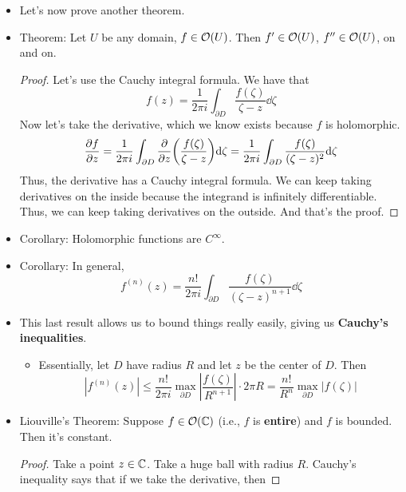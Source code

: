 \documentclass[../notes.tex]{subfiles}
\begin{document}
\begin{itemize}
    \item Let's now prove another theorem.
    \item Theorem: Let $U$ be any domain, $f\in\mathcal{O}(U)$. Then $f'\in\mathcal{O}(U)$, $f''\in\mathcal{O}(U)$, on and on.
    \begin{proof}
        Let's use the Cauchy integral formula. We have that
        \begin{equation*}
            f(z) = \frac{1}{2\pi i}\int_{\partial D}\frac{f(\zeta)}{\zeta-z}\dd\zeta
        \end{equation*}
        Now let's take the derivative, which we know exists because $f$ is holomorphic.
        \begin{equation*}
            \pdv{f}{z} = \frac{1}{2\pi i}\int_{\partial D}\pdv{z}(\frac{f(\zeta)}{\zeta-z})\dd\zeta
            = \frac{1}{2\pi i}\int_{\partial D}\frac{f(\zeta)}{(\zeta-z)^2}\dd\zeta
        \end{equation*}
        Thus, the derivative has a Cauchy integral formula. We can keep taking derivatives on the inside because the integrand is infinitely differentiable. Thus, we can keep taking derivatives on the outside. And that's the proof.
    \end{proof}
    \item Corollary: Holomorphic functions are $C^\infty$.
    \item Corollary: In general,
    \begin{equation*}
        f^{(n)}(z) = \frac{n!}{2\pi i}\int_{\partial D}\frac{f(\zeta)}{(\zeta-z)^{n+1}}\dd\zeta
    \end{equation*}
    \item This last result allows us to bound things really easily, giving us \textbf{Cauchy's inequalities}.
    \begin{itemize}
        \item Essentially, let $D$ have radius $R$ and let $z$ be the center of $D$. Then
        \begin{equation*}
            |f^{(n)}(z)| \leq \frac{n!}{2\pi i}\max_{\partial D}\left| \frac{f(\zeta)}{R^{n+1}} \right|\cdot 2\pi R
            = \frac{n!}{R^n}\max_{\partial D}|f(\zeta)|
        \end{equation*}
    \end{itemize}
    \item Liouville's Theorem: Suppose $f\in\mathcal{O}(\mathbb{C})$ (i.e., $f$ is \textbf{entire}) and $f$ is bounded. Then it's constant.
    \begin{proof}
        Take a point $z\in\mathbb{C}$. Take a huge ball with radius $R$. Cauchy's inequality says that if we take the derivative, then

\end{proof}
\end{itemize}
\end{document}
